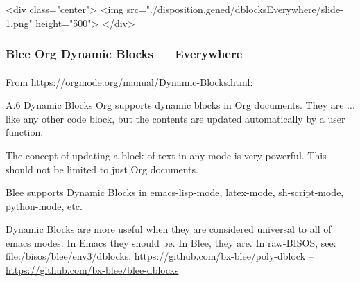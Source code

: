 \begin{whenOrg}
\begin{htmlonly}

\begin{frame}[fragile,plain,label=dblocksEverywhere]
    \frametitle{}
    \framesubtitle{}
    \begin{rawhtml}
<div class="center">
<img src="./disposition.gened/dblocksEverywhere/slide-1.png" height="500">
</div>
    \end{rawhtml}
\end{frame}
\end{htmlonly}

\begin{verblatex}

\begin{frame}[fragile,plain,label=dblocksEverywhere]
    \frametitle{Blee Org Dynamic Blocks --- Everywhere}
    \framesubtitle{}


    From \url{https://orgmode.org/manual/Dynamic-Blocks.html}:

    \begin{exampleblock}{A.6 Dynamic Blocks}
      Org supports dynamic blocks in Org documents. They are ...  like any other code block, but the contents are updated automatically by a
      user function.
    \end{exampleblock}

    The concept of updating a block of text in any mode  is very powerful.
    This  should not be limited to just Org documents.

    Blee supports Dynamic Blocks in emacs-lisp-mode, latex-mode, sh-script-mode,
    python-mode, etc.

    \bigskip

    Dynamic Blocks are more useful when they are considered universal to all of emacs
    modes. In Emacs they should be. In Blee, they are. In raw-BISOS, see:  \url{file:/bisos/blee/env3/dblocks},
    \url{https://github.com/bx-blee/poly-dblock} -- \url{https://github.com/bx-blee/blee-dblocks}



\end{frame}
\end{verblatex}
\end{whenOrg}
